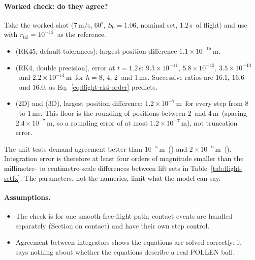 \paragraph{Worked check: do they agree?}
Take the worked shot ($7$\,\unit{m/s}\assumed, $60^\circ$\assumed, $S_0 = 1.06$\assumed, nominal set,
$1.2$\,\unit{s}\assumed\ of flight) and use  with $r_{\mathrm{tol}} = 10^{-12}$\assumed\ as the
reference.
\begin{itemize}
  \item {} (RK45, default tolerances): largest position difference
    $1.1\times10^{-15}$\,\unit{m}\predicted.
  \item {} (RK4, double precision), error at $t = 1.2$\,\unit{s}:
    $9.3\times10^{-11}$\predicted, $5.8\times10^{-12}$\predicted, $3.5\times10^{-13}$\predicted\ and
    $2.2\times10^{-14}$\,\unit{m}\predicted\ for $h = 8$\assumed, $4$\assumed, $2$\assumed\ and
    $1$\,\unit{ms}\assumed.
    Successive ratios are $16.1$\derived, $16.6$\derived\ and $16.0$\derived, as
    Eq.~\eqref{eq:flight-rk4-order} predicts.
  \item {} (2D) and  (3D), largest position difference:
    $1.2\times10^{-7}$\,\unit{m}\predicted\ for every step from $8$\assumed\ to $1$\,\unit{ms}\assumed.
    This floor is the  rounding of positions between $2$\derived\ and $4$\,\unit{m}\derived\
    (spacing $2.4\times10^{-7}$\,\unit{m}\derived, so a rounding error of at most
    $1.2\times10^{-7}$\,\unit{m}\derived), not truncation error.
\end{itemize}
The unit tests demand agreement better than $10^{-5}$\,\unit{m}\assumed\ ()
and $2\times10^{-6}$\,\unit{m}\assumed\ (\code{tests/test\_contact.py}).
Integration error is therefore at least four orders of magnitude smaller than the millimetre- to
centimetre-scale differences between lift sets in Table~\ref{tab:flight-setfx}.
The parameters, not the numerics, limit what the model can say.

\paragraph{Assumptions.}
\begin{itemize}
  \item The check is for one smooth free-flight path; contact events are handled separately
    (Section on contact) and have their own step control.
  \item Agreement between integrators shows the equations are solved correctly; it says nothing about
    whether the equations describe a real POLLEN ball.
\end{itemize}

